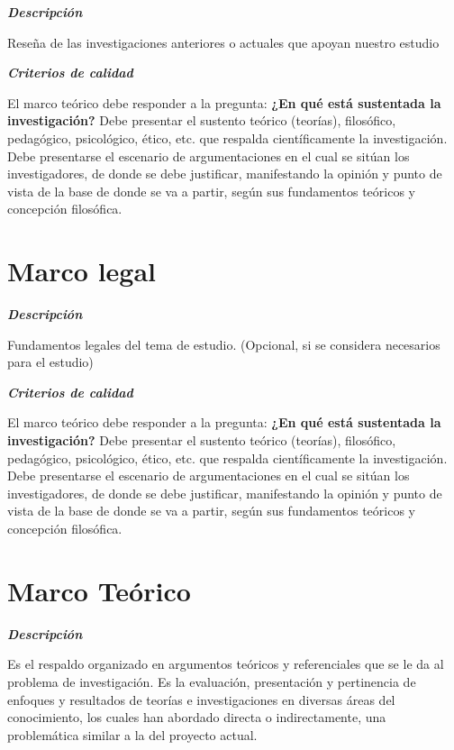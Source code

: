     \textbf{\textit{Descripción}}
    
    Reseña de las investigaciones anteriores o actuales que apoyan nuestro estudio
    
    \textbf{\textit{Criterios de calidad}}
    
    El marco teórico debe responder a la pregunta: \textbf{¿En qué está sustentada la investigación?}
    Debe presentar el sustento teórico (teorías), filosófico, pedagógico, psicológico, ético, etc. que respalda científicamente la investigación.
    Debe presentarse el escenario de argumentaciones en el cual se sitúan los investigadores, de donde se debe justificar, manifestando la opinión y punto de vista de la base de donde se va a partir, según sus fundamentos teóricos y concepción filosófica.

\section{Marco legal}

    \textbf{\textit{Descripción}}
    
    Fundamentos legales del tema de estudio. (Opcional, si se considera necesarios para el estudio)
    
    \textbf{\textit{Criterios de calidad}}
    
    El marco teórico debe responder a la pregunta: \textbf{¿En qué está sustentada la investigación?}
    Debe presentar el sustento teórico (teorías), filosófico, pedagógico, psicológico, ético, etc. que respalda científicamente la investigación.
    Debe presentarse el escenario de argumentaciones en el cual se sitúan los investigadores, de donde se debe justificar, manifestando la opinión y punto de vista de la base de donde se va a partir, según sus fundamentos teóricos y concepción filosófica.

\section{Marco Teórico}

    \textbf{\textit{Descripción}}
    
    Es el respaldo organizado en argumentos teóricos y referenciales que se le da al problema de investigación. Es la evaluación, presentación y pertinencia de enfoques y resultados de teorías e investigaciones en diversas áreas del conocimiento, los cuales han abordado directa o indirectamente, una problemática similar a la del proyecto actual.
    
